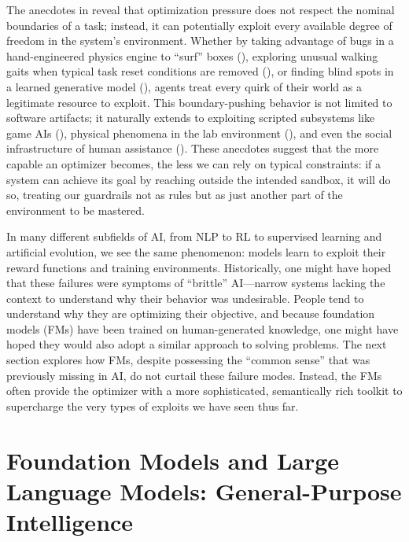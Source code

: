 \documentclass[10pt]{article}
\begin{document}
The anecdotes in  reveal that optimization pressure does not respect the nominal boundaries of a task; instead, it can potentially exploit every available degree of freedom in the system's environment.
Whether by taking advantage of bugs in a hand-engineered physics engine to ``surf'' boxes (), exploring unusual walking gaits when typical task reset conditions are removed (), or finding blind spots in a learned generative model (), agents treat every quirk of their world as a legitimate resource to exploit.
This boundary-pushing behavior is not limited to software artifacts; it naturally extends to exploiting scripted subsystems like game AIs (), physical phenomena in the lab environment (), and even the social infrastructure of human assistance ().
These anecdotes suggest that the more capable an optimizer becomes, the less we can rely on typical constraints: if a system can achieve its goal by reaching outside the intended sandbox, it will do so, treating our guardrails not as rules but as just another part of the environment to be mastered.


In many different subfields of AI, from NLP to RL to supervised learning and artificial evolution, we see the same phenomenon: models learn to exploit their reward functions and training environments.
Historically, one might have hoped that these failures were symptoms of ``brittle'' AI---narrow systems lacking the context to understand why their behavior was undesirable. 
People tend to understand why they are optimizing their objective, and because foundation models (FMs) have been trained on human-generated knowledge, one might have hoped they would also adopt a similar approach to solving problems.
The next section explores how FMs, despite possessing the ``common sense'' that was previously missing in AI, do not curtail these failure modes. 
Instead, the FMs often provide the optimizer with a more sophisticated, semantically rich toolkit to supercharge the very types of exploits we have seen thus far.


\section{Foundation Models and Large Language Models: General-Purpose Intelligence}
\label{llmSection}
\end{document}
